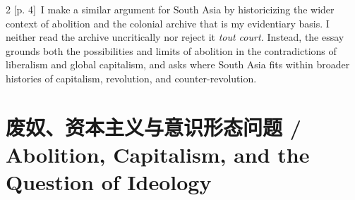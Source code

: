 \documentclass[10pt,a4paper]{article}
\begin{document}
\begin{paracol}{2}
\switchcolumn
{\scriptsize\color{gray} [p. 4]}\ I make a similar argument for South Asia by historicizing the wider context of abolition and the colonial archive that is my evidentiary basis. I neither read the archive uncritically nor reject it \textit{tout court.} Instead, the essay grounds both the possibilities and limits of abolition in the contradictions of liberalism and global capitalism, and asks where South Asia fits within broader histories of capitalism, revolution, and counter-revolution.\par
\switchcolumn*
\end{paracol}
\section*{废奴、资本主义与意识形态问题 / Abolition, Capitalism, and the Question of Ideology}
\end{document}
